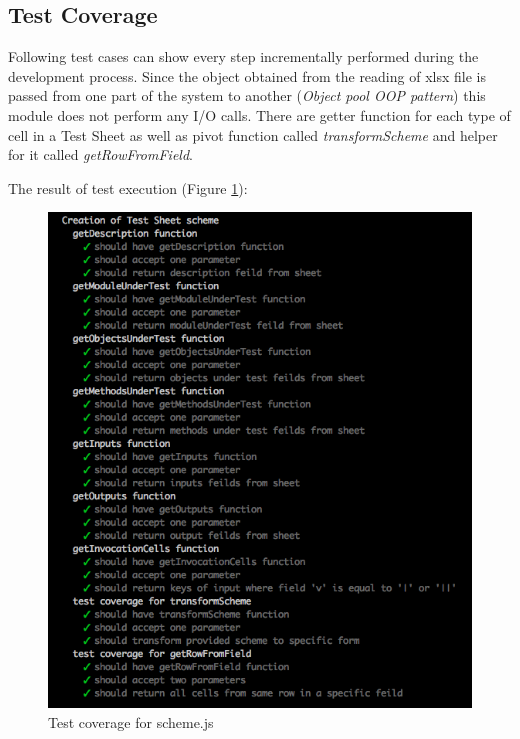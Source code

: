 \subsection{Test Coverage}
Following test cases can show every step incrementally performed during the development process. Since the object obtained from the reading of xlsx file is passed from one part of the system to another (\textit{Object pool OOP pattern}) this module does not perform any I/O calls. There are getter function for each type of cell in a Test Sheet as well as pivot function called \textit{transformScheme} and helper for it called \textit{getRowFromField}.
%

The result of test execution (Figure \ref{fig:testScheme}): 
\begin{figure}[H]
	\centering
	\includegraphics[width=\linewidth]{grafiken/testScheme.png}
	\caption{Test coverage for scheme.js}
	\label{fig:testScheme}
\end{figure}

